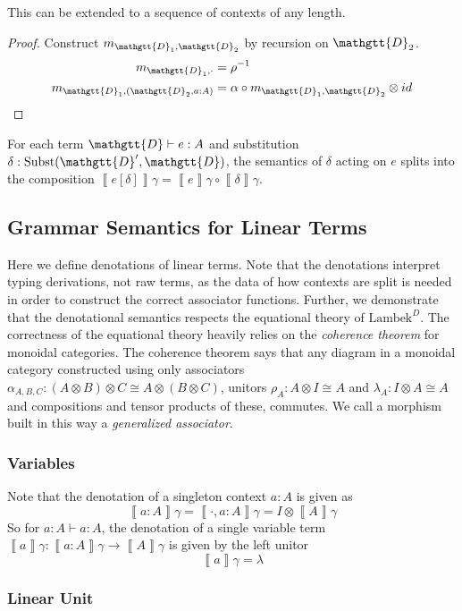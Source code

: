 \documentclass[acmsmall,nonacm]{acmart}
\renewcommand{\Delta}{\mathgtt{D}}
\newcommand{\sem}[1]{\left\llbracket{#1}\right\rrbracket}
\newcommand{\semg}[1]{\sem{#1}\gamma}
\newcommand{\theoryabbv}{$\textrm{Lambek}^D$\xspace}
\begin{document}
{\begin{theorem}
  This can be extended to a sequence of contexts of any length.
\end{theorem}
\begin{proof}
Construct $m_{\Delta_{1},\Delta_{2}}$ by recursion on $\Delta_{2}$.
\begin{align*}
  m_{\Delta_{1},\cdot} & = \rho^{-1} \\
  m_{\Delta_{1},(\Delta_{2}, a : A)} & = \alpha \circ m_{\Delta_{1},\Delta_{2}} \otimes id
\end{align*}
\end{proof}

\begin{lemma}
  \label{lem:subst}
  For each term $\Delta \vdash e : A$ and substitution
  $\delta : \textrm{Subst}(\Delta', \Delta)$, the semantics of $\delta$ acting
  on $e$ splits into the composition $\semg{e[\delta]} = \semg{e} \circ \semg{\delta}$.
\end{lemma}

\subsection{Grammar Semantics for Linear Terms}
Here we define denotations of linear terms. Note that the denotations
interpret typing derivations, not raw terms, as the data of how
contexts are split is needed in order to construct the correct
associator functions. Further, we demonstrate that the denotational
semantics respects the equational theory of \theoryabbv. The
correctness of the equational theory heavily relies on the
\emph{coherence theorem} for monoidal categories. The coherence
theorem says that any diagram in a monoidal category constructed using
only associators $\alpha_{A,B,C} : (A \otimes B) \otimes C \cong A
\otimes (B \otimes C)$, unitors $\rho_A : A \otimes I \cong A$ and
$\lambda_A : I \otimes A \cong A$ and compositions and tensor products
of these, commutes. We call a morphism built in this way a
\emph{generalized associator}.

\subsubsection{Variables}
Note that the denotation of a singleton context $a : A$ is given as
\[
  \semg{a : A} = \semg{\cdot , a : A} = I \otimes \semg{A}
\]
So for $a: A \vdash a : A$, the denotation of a single variable term
$\semg{a} : \semg{a : A} \to \semg{A}$ is given by the left unitor
\[
  \semg{a} = \lambda
\]

\subsubsection{Linear Unit}
}
\end{document}
